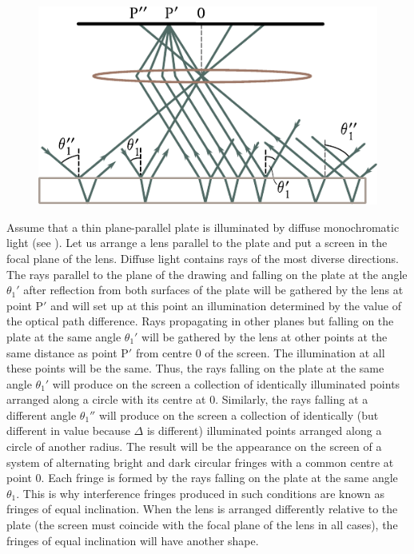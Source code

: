 \begin{figure}[t]
	\begin{center}
		\includegraphics[scale=1]{figures/ch_17/fig_17_12.pdf}
		\caption[]{}
		\label{fig:17_12}
	\end{center}
	\vspace{-0.8cm}
\end{figure}

Assume that a thin plane-parallel plate is illuminated by diffuse monochromatic light (see ).
Let us arrange a lens parallel to the plate and put a screen in the focal plane of the lens.
Diffuse light contains rays of the most diverse directions.
The rays parallel to the plane of the drawing and falling on the plate at the angle $\theta_1'$ after reflection from both surfaces of the plate will be gathered by the lens at point P$'$ and will set up at this point an illumination determined by the value of the optical path difference.
Rays propagating in other planes but falling on the plate at the same angle $\theta_1'$
will be gathered by the lens at other points at the same distance as point P$'$ from centre $0$ of the screen.
The illumination at all these points will be the same.
Thus, the rays falling on the plate at the same angle $\theta_1'$ will produce on the screen a collection of identically illuminated points arranged along a circle with its centre at $0$.
Similarly, the rays falling at a different angle $\theta_1''$ will produce on the screen a collection of identically (but different in value because $\Delta$ is different) illuminated points arranged along a circle of another radius.
The result will be the appearance on the screen of a system of alternating bright and dark circular fringes with a common centre at point $0$.
Each fringe is formed by the rays falling on the plate at the same angle $\theta_1$.
This is why interference fringes produced in such conditions are known as fringes of equal inclination.
When the lens is arranged differently relative to the plate (the screen must coincide with the focal plane of the lens in all cases), the fringes of equal inclination will have another shape.

